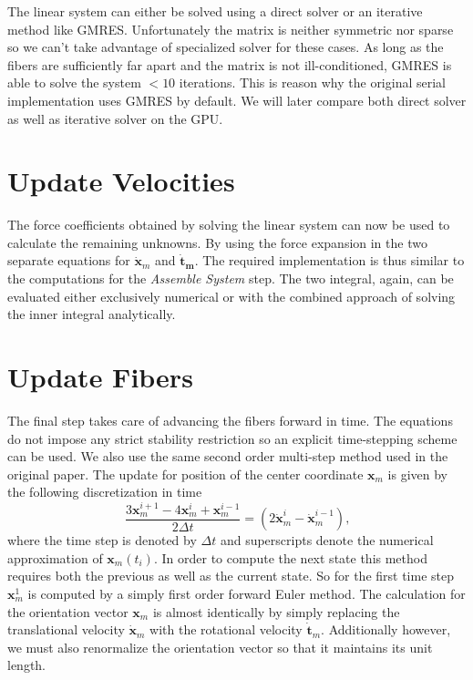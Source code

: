 \documentclass[a4paper,11pt]{kth-mag}
\begin{document}
The linear system can either be solved using a direct solver or an iterative method like GMRES. Unfortunately the matrix is neither symmetric nor sparse so we can't take advantage of specialized solver for these cases. As long as the fibers are sufficiently far apart and the matrix is not ill-conditioned, GMRES is able to solve the system $<10$ iterations. This is reason why the original serial implementation uses GMRES by default. We will later compare both direct solver as well as iterative solver on the GPU.

\section{Update Velocities}

The force coefficients obtained by solving the linear system can now be used to calculate the remaining unknowns. By using the force expansion in the two separate equations for $\mathbf{\dot{x}}_m$ and $\mathbf{\dot{t}_m}$. The required implementation is thus similar to the computations for the \emph{Assemble System} step. The two integral, again, can be evaluated either exclusively numerical or with the combined approach of solving the inner integral analytically.

\section{Update Fibers}

The final step takes care of advancing the fibers forward in time. The equations do not impose any strict stability restriction so an explicit time-stepping scheme can be used. We also use the same second order multi-step method used in the original paper. The update for position of the center coordinate $\mathbf{x}_m$ is given by the following discretization in time
\begin{equation}
  \label{eq:time_discretization}
  \frac{3\mathbf{x}_m^{i+1} - 4\mathbf{x}_m^{i} + \mathbf{x}_m^{i-1}}{2 \Delta t} = (2\mathbf{\dot{x}}_m^{i} - \mathbf{\dot{x}}_m^{i-1}) \text{,}
\end{equation}
where the time step is denoted by $\Delta t$ and superscripts denote the numerical approximation of $\mathbf{x}_m(t_i)$. In order to compute the next state this method requires both the previous as well as the current state. So for the first time step $\mathbf{x}_{m}^{1}$ is computed by a simply first order forward Euler method. The calculation for the orientation vector $\mathbf{x}_m$ is almost identically by simply replacing the translational velocity $\mathbf{\dot{x}}_m$ with the rotational velocity $\mathbf{\dot{t}}_m$. Additionally however, we must also renormalize the orientation vector so that it maintains its unit length.
\end{document}
